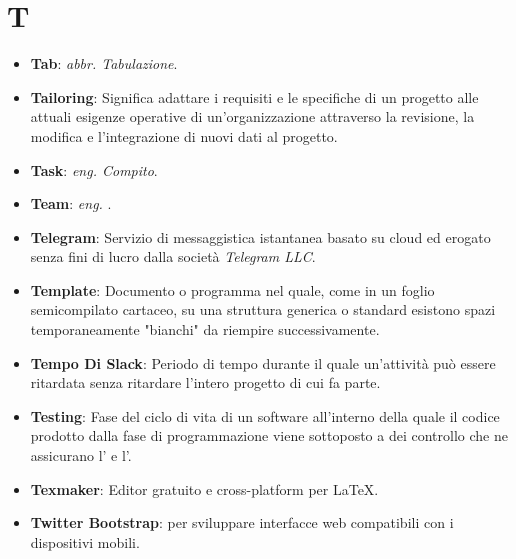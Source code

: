 \section*{T}
\begin{itemize}
	\item
	\textbf{Tab}: \textit{abbr. Tabulazione}.
	\item
	\textbf{Tailoring}: Significa adattare i requisiti e le specifiche di un progetto alle attuali esigenze operative di un'organizzazione attraverso la revisione, la modifica e l'integrazione di nuovi dati al progetto.
	\item
	\textbf{Task}: \textit{eng. Compito}.
	\item
	\textbf{Team}: \textit{eng. }.
	\item
	\textbf{Telegram}: Servizio di messaggistica istantanea basato su cloud ed erogato senza fini di lucro dalla società \textit{Telegram LLC}.
	\item
	\textbf{Template}: Documento o programma nel quale, come in un foglio semicompilato cartaceo, su una struttura generica o standard esistono spazi temporaneamente "bianchi" da riempire successivamente.
	\item
	\textbf{Tempo Di Slack}: Periodo di tempo durante il quale un'attività può essere ritardata senza ritardare l'intero progetto di cui fa parte.
	\item
	\textbf{Testing}: Fase del ciclo di vita di un software all'interno della quale il codice prodotto dalla fase di programmazione viene sottoposto a dei controllo che ne assicurano l' e l'.
	\item
	\textbf{Texmaker}: Editor gratuito e cross-platform per LaTeX.
	\item
	\textbf{Twitter Bootstrap}:  per sviluppare interfacce web compatibili con i dispositivi mobili.
\end{itemize}
\newpage